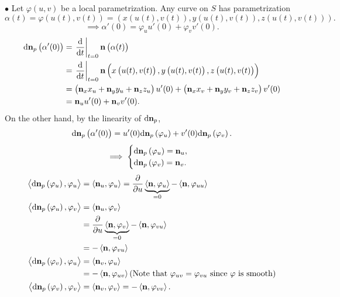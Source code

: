 \(\bullet\) Let \(\varphi(u,v)\) be a local parametrization. 
Any curve on \(S\) has parametrization
\[  
    \alpha(t)=\varphi\left(u(t),v(t)\right)=
    \left(x\left(u(t),v(t)\right),
        y\left(u(t),v(t)\right),
        z\left(u(t),v(t)\right)\right).
\]
\[\implies \alpha'(0)=\varphi_u u'(0)+\varphi_v v'(0).\]
\begin{align*}
    \dd \vb{n}_p\left(\alpha'(0)\right)
    &=\left.\dv{t}\right|_{t=0}\vb{n}\left(\alpha(t)\right)\\
    &=\left.\dv{t}\right|_{t=0}\vb{n}
    \left(x\left(u(t),v(t)\right),
        y\left(u(t),v(t)\right),
        z\left(u(t),v(t)\right)\right)\\
    &=\left(\vb{n}_x x_u+\vb{n}_y y_u+\vb{n}_z z_u\right)u'(0)
    +\left(\vb{n}_x x_v+\vb{n}_y y_v+\vb{n}_z z_v\right)v'(0)\\    
    &=\vb{n}_u u'(0)+\vb{n}_v v'(0).
\end{align*}
On the other hand, by the linearity of \(\dd \vb{n}_p\), 
\[
    \dd\vb{n}_p\left(\alpha'(0)\right)=u'(0)\dd \vb{n}_p
    \left(\varphi_u\right)+v'(0)\dd\vb{n}_p \left(\varphi_v\right).    
\]
\[
    \implies
    \begin{cases}
        \dd\vb{n}_p\left(\varphi_u\right)=\vb{n}_u,\\
        \dd\vb{n}_p\left(\varphi_v\right)=\vb{n}_v.
    \end{cases}
\]
\begin{align*}
    \left\langle \dd\vb{n}_p\left(\varphi_u\right),\varphi_u
    \right\rangle
    &=\left\langle\vb{n}_u,\varphi_u\right\rangle=
    \pdv{u}\underbrace{\left\langle\vb{n},\varphi_u\right\rangle}_{=0}
    -\left\langle\vb{n},\varphi_{uu}\right\rangle\\
    \left\langle \dd\vb{n}_p\left(\varphi_u\right),\varphi_v
    \right\rangle
    &=\left\langle\vb{n}_u,\varphi_v\right\rangle\\
    &=\pdv{u}\underbrace{\left\langle\vb{n},\varphi_v\right\rangle}_{=0}
    -\left\langle\vb{n},\varphi_{vu}\right\rangle\\
    &=-\left\langle\vb{n},\varphi_{vu}\right\rangle\\
    \left\langle \dd\vb{n}_p\left(\varphi_v\right),\varphi_u
    \right\rangle
    &=\left\langle\vb{n}_v,\varphi_u\right\rangle\\
    &=-\left\langle\vb{n},\varphi_{uv}\right\rangle
    (\text{Note that }\varphi_{uv}=\varphi_{vu}\text{ since }
    \varphi\text{ is smooth})\\
    \left\langle \dd\vb{n}_p\left(\varphi_v\right),\varphi_v
    \right\rangle
    &=\left\langle\vb{n}_v,\varphi_v\right\rangle
    =-\left\langle \vb{n}, \varphi_{vv}\right\rangle.
\end{align*}
